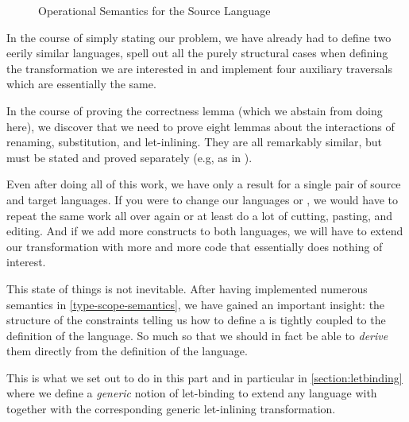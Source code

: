 \begin{figure}[h]
\caption{Operational Semantics for the Source Language\label{fig:opersem}}
\end{figure}

In the course of simply stating our problem, we have already had to define two
eerily similar languages, spell out all the purely structural cases when defining
the transformation we are interested in and implement four auxiliary traversals
which are essentially the same.

In the course of proving the correctness lemma (which we abstain from doing here),
we discover that we need to prove eight lemmas about the interactions of renaming,
substitution, and let-inlining. They are all remarkably similar, but must be stated
and proved separately (e.g, as in \cite{benton2012strongly}).

Even after doing all of this work, we have only a result for a single pair of
source and target languages. If you were to change our languages  or
, we would have to repeat the same work all over again or at least do a
lot of cutting, pasting, and editing. And if we add more constructs to both
languages, we will have to extend our transformation with more and more code
that essentially does nothing of interest.

This state of things is not inevitable. After having implemented numerous
semantics in \cref{type-scope-semantics}, we have gained an important insight:
the structure of the constraints telling us how to define a  is
tightly coupled to the definition of the language. So much so that we should
in fact be able to \emph{derive} them directly from the definition of the
language.

This is what we set out to do in this part and in particular in \cref{section:letbinding}
where we define a \emph{generic} notion of let-binding to extend any language
with together with the corresponding generic let-inlining transformation.
